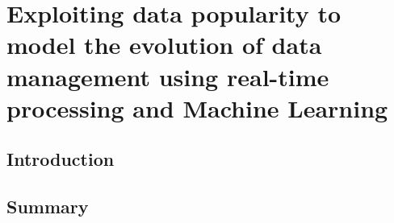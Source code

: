 \chapter{Exploiting data popularity to model the evolution of data management using real-time processing and Machine Learning} \label{ml-real}


\section{Introduction} \label{ml-intro}
\section{Summary} \label{ml-summ}




